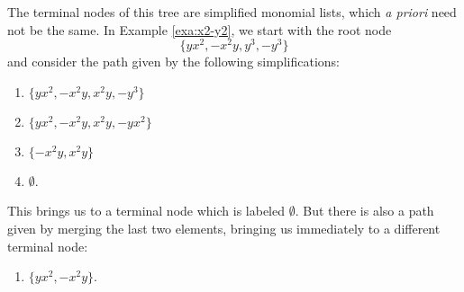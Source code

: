The terminal nodes of this tree are simplified monomial lists, which \textit{a priori} need not be the same. In Example \ref{exa:x2-y2}, we start with the root node
\[
	\{yx^2, -x^2y, y^3, -y^3\}
\]
and consider the path given by the following simplifications:
\begin{enumerate}
	\item $\{yx^2, -x^2y, x^2y, -y^3\}$
	\item $\{yx^2, -x^2y, x^2y, -yx^2\}$
	\item $\{-x^2y, x^2y\}$
	\item $\emptyset$.
\end{enumerate}
This brings us to a terminal node which is labeled $\emptyset$. But there is also a path given by merging the last two elements, bringing us immediately to a different terminal node:
\begin{enumerate}
	\item $\{yx^2, -x^2y\}$.
\end{enumerate}

